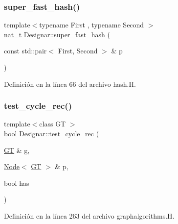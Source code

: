 \subsubsection{\texorpdfstring{super\+\_\+fast\+\_\+hash()}{super\_fast\_hash()}\hspace{0.1cm}{\footnotesize\ttfamily [5/5]}}
{\footnotesize\ttfamily template$<$typename First , typename Second $>$ \\
\hyperlink{namespace_designar_aa72662848b9f4815e7bf31a7cf3e33d1}{nat\+\_\+t} Designar\+::super\+\_\+fast\+\_\+hash (\begin{DoxyParamCaption}\item[{const std\+::pair$<$ First, Second $>$ \&}]{p }\end{DoxyParamCaption})\hspace{0.3cm}{\ttfamily [inline]}}



Definición en la línea 66 del archivo hash.\+H.

\mbox{\label{namespace_designar_a1d3028c78c40ec397096fb112f34eb78}} 
\subsubsection{\texorpdfstring{test\+\_\+cycle\+\_\+rec()}{test\_cycle\_rec()}}
{\footnotesize\ttfamily template$<$class GT $>$ \\
bool Designar\+::test\+\_\+cycle\+\_\+rec (\begin{DoxyParamCaption}\item[{\hyperlink{demo-buildgraph_8_c_a3001c40d2c31ca87ed96cd7d1334a55e}{GT} \&}]{g,  }\item[{\hyperlink{namespace_designar_a5af326c65aa2bd26b26c410f2030d09e}{Node}$<$ \hyperlink{demo-buildgraph_8_c_a3001c40d2c31ca87ed96cd7d1334a55e}{GT} $>$ \&}]{p,  }\item[{bool}]{has }\end{DoxyParamCaption})}



Definición en la línea 263 del archivo graphalgorithms.\+H.

\mbox{\label{namespace_designar_a29b53c8e7dfb33209e0a79ad167b6803}} 
